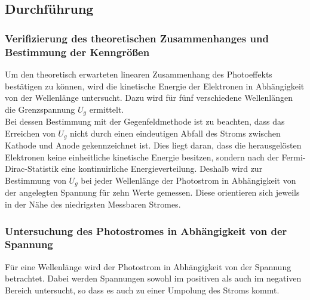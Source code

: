 \subsection{Durchführung}
\label{sec:durchführung}

\subsubsection{Verifizierung des theoretischen Zusammenhanges und Bestimmung der Kenngrößen}
Um den theoretisch erwarteten linearen Zusammenhang des Photoeffekts bestätigen zu können, wird die kinetische Energie der Elektronen in Abhängigkeit von der Wellenlänge untersucht.
Dazu wird für fünf verschiedene Wellenlängen die Grenzspannung $U_g$ ermittelt.\\
Bei dessen Bestimmung mit der Gegenfeldmethode ist zu beachten, dass das Erreichen von $U_g$ nicht durch einen eindeutigen Abfall des Stroms zwischen Kathode und Anode gekennzeichnet ist.
Dies liegt daran, dass die herausgelösten Elektronen keine einheitliche kinetische Energie besitzen, sondern nach der Fermi-Dirac-Statistik eine kontinuirliche Energieverteilung.
Deshalb wird zur Bestimmung von $U_g$ bei jeder Wellenlänge der Photostrom in Abhängigkeit von der angelegten Spannung für zehn Werte gemessen.
Diese orientieren sich jeweils in der Nähe des niedrigsten Messbaren Stromes.

\subsubsection{Untersuchung des Photostromes in Abhängigkeit von der Spannung}
Für eine Wellenlänge wird der Photostrom in Abhängigkeit von der Spannung betrachtet.
Dabei werden Spannungen sowohl im positiven als auch im negativen Bereich untersucht, so dass es auch zu einer Umpolung des Stroms kommt.

